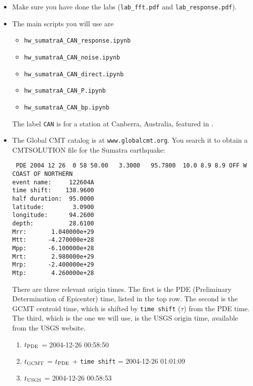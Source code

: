 \documentclass[11pt,titlepage,fleqn]{article}
\newcommand{\tfileresponse}{{\tt hw\_sumatraA\_CAN\_response.ipynb}}
\newcommand{\tfilenoise}{{\tt hw\_sumatraA\_CAN\_noise.ipynb}}
\newcommand{\tfileP}{{\tt hw\_sumatraA\_CAN\_P.ipynb}}
\newcommand{\tfilebp}{{\tt hw\_sumatraA\_CAN\_bp.ipynb}}
\newcommand{\tfiledirect}{{\tt hw\_sumatraA\_CAN\_direct.ipynb}}
\begin{document}
\begin{itemize}

\item Make sure you have done the labs (\verb+lab_fft.pdf+ and \verb+lab_response.pdf+).

\item The main scripts you will use are
%
\begin{itemize}
\item \tfileresponse\
\item \tfilenoise\
\item \tfiledirect\
\item \tfileP\
\item \tfilebp\
\end{itemize}
%
The label \verb+CAN+ is for a station at Canberra, Australia, featured in \citet[][Figure~1]{Park2005}.


\item The Global CMT catalog is at \verb+www.globalcmt.org+. You search it to obtain a CMTSOLUTION file for the Sumatra earthquake:
%
\begin{verbatim}
 PDE 2004 12 26  0 58 50.00   3.3000   95.7800  10.0 8.9 8.9 OFF W COAST OF NORTHERN                 
event name:     122604A        
time shift:    138.9600
half duration:  95.0000
latitude:        3.0900
longitude:      94.2600
depth:          28.6100
Mrr:       1.040000e+29
Mtt:      -4.270000e+28
Mpp:      -6.100000e+28
Mrt:       2.980000e+29
Mrp:      -2.400000e+29
Mtp:       4.260000e+28
\end{verbatim}
%
There are three relevant origin times. The first is the PDE (Preliminary Determination of Epicenter) time, listed in the top row. The second is the GCMT centroid time, which is shifted by \verb+time shift+ ($\tau$) from the PDE time. The third, which is the one we will use, is the USGS origin time, available from the USGS website.
%
\begin{enumerate}
\item $t_{\rm PDE}$ = 2004-12-26 00:58:50
\item $t_{\rm GCMT}$ = $t_{\rm PDE}$ + \verb+time shift+ = 2004-12-26 01:01:09
\item $t_{\rm USGS}$ = 2004-12-26 00:58:53
\end{enumerate}


\end{itemize}
\end{document}
